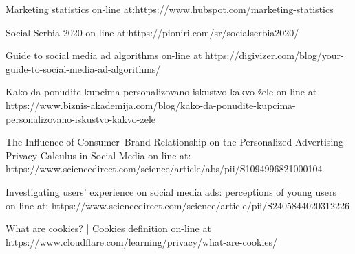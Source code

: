 \documentclass[a4paper]{article}
\begin{document}
	\renewcommand{\refname}{Literatura}

	\newpage
	\appendix
	

	
	\begin{thebibliography}{9}
		
		 Marketing statistics on-line at:https://www.hubspot.com/marketing-statistics
		
		 Social Serbia 2020 on-line at:https://pioniri.com/sr/socialserbia2020/
		
			Guide to social media ad algorithms on-line at https://digivizer.com/blog/your-guide-to-social-media-ad-algorithms/ 
		
		 Kako da ponudite kupcima personalizovano iskustvo kakvo žele on-line at https://www.biznis-akademija.com/blog/kako-da-ponudite-kupcima-personalizovano-iskustvo-kakvo-zele
		
		 The Influence of Consumer–Brand Relationship on the Personalized Advertising Privacy Calculus in Social Media on-line at: https://www.sciencedirect.com/science/article/abs/pii/S1094996821000104        
		
		 Investigating users’ experience on social media ads: perceptions of young users on-line at: https://www.sciencedirect.com/science/article/pii/S2405844020312226
		
		 What are cookies? | Cookies definition on-line at https://www.cloudflare.com/learning/privacy/what-are-cookies/
		
		
	\end{thebibliography}
	
	\appendix
\end{document}
